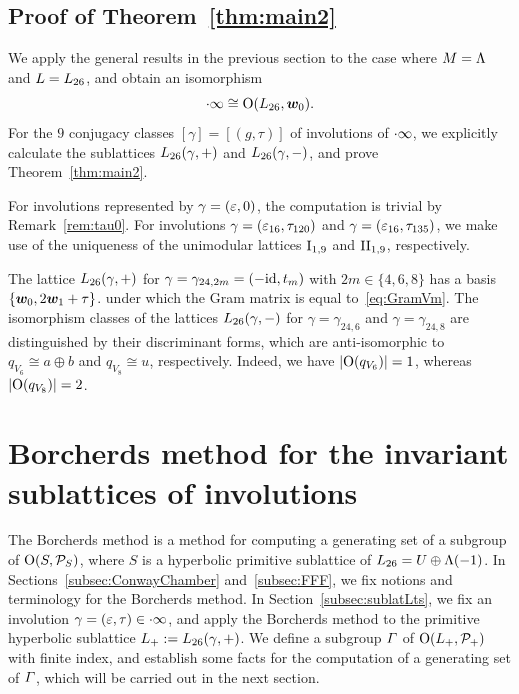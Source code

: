 \documentclass{amsart} %
\begin{document}
\subsection{Proof of Theorem~\ref{thm:main2}}\label{subsec:proofmain2}
%
We apply the general results in the previous section to the case where $M=\Lambda$ and $L=L_{26}$,
and obtain an isomorphism 
\[
\cdot \infty\cong \mathord{\mathrm{O}}(L_{26}, \boldsymbol{w}_0).
\]
For the $9$ conjugacy classes 
$[\gamma]=[(g, \tau)]$ of involutions of $\cdot \infty$,
we explicitly calculate the sublattices $L_{26}(\gamma, +)$ and $L_{26}(\gamma, -)$, 
and prove Theorem~\ref{thm:main2}.
%
\begin{remark}
For involutions represented by $\gamma=(\varepsilon, 0)$,
the computation is trivial by Remark~\ref{rem:tau0}.
For involutions $\gamma=(\varepsilon_{16},\tau_{120})$ and $\gamma=(\varepsilon_{16},\tau_{135})$,
we make use of the uniqueness of the unimodular lattices $\mathrm{I}_{1, 9}$ and $\mathrm{II}_{1, 9}$,
respectively.
\end{remark}
%
%
%
\begin{remark}
The lattice $L_{26}(\gamma,+)$ for $\gamma=\gamma_{24,2m}=(-\mathord{\mathrm{id}}, t_m)$
with $2m \in \{4,6,8\}$ has a basis $\{\boldsymbol{w}_0, 2\boldsymbol{w}_1+\tau\}$.
under which the Gram matrix is equal to~\eqref{eq:GramVm}.
The isomorphism classes of the lattices $L_{26}(\gamma,-)$ for $\gamma=\gamma_{24,6}$ 
and $\gamma=\gamma_{24,8}$ 
are distinguished by their discriminant forms,
which are anti-isomorphic to $q_{V_6}\cong a\oplus b$ and $q_{V_8}\cong u$, respectively. 
Indeed, we have  $|\mathord{\mathrm{O}}(q_{V_6})|=1$, 
whereas  $|\mathord{\mathrm{O}}(q_{V_8})|=2$.
 \end{remark}
%
%
%
\section{Borcherds method for the invariant sublattices of involutions}\label{sec:Borcherds}
%
The Borcherds method is a method for computing a generating set of 
a subgroup of  $\mathord{\mathrm{O}}(S, \mathord{\mathcal{P}}_S)$, %
where $S$ is  a hyperbolic primitive sublattice of $L_{26}=U\oplus \Lambda(-1)$.
In Sections~\ref{subsec:ConwayChamber} and~\ref{subsec:FFF},
we fix notions and terminology for the Borcherds method.
In Section~\ref{subsec:sublatLts}, 
we fix an involution
$\gamma=(\varepsilon, \tau)\in \cdot \infty$, and 
apply the Borcherds method to the primitive hyperbolic sublattice
$L_{+}:=L_{26}(\gamma, +)$.
We define a subgroup $\varGamma$ of $ \mathord{\mathrm{O}}(L_{+}, \mathord{\mathcal{P}}_{+})$
with finite index, and establish some facts
for the computation of a  generating set of
 $\varGamma$, which will be carried out in the next section.
%
%
\end{document}

